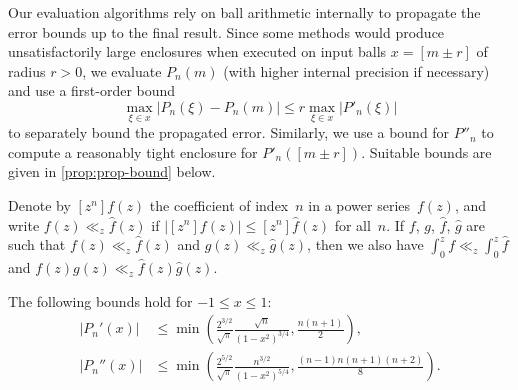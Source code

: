 \documentclass[nohypdvips,review]{siamart0216}
\begin{document}
Our evaluation algorithms rely on ball arithmetic internally to
propagate the error bounds up to the final result.
Since some methods would produce unsatisfactorily large enclosures
when executed on input balls $x = [m \pm r]$ of radius $r > 0$, we
evaluate $P_n(m)$ (with higher internal precision if necessary) and
use a first-order bound
\[ \max_{\xi \in x} |P_n(\xi) - P_n(m)|
   \le r \max_{\xi \in x} |P'_n(\xi)| \]
to separately bound the propagated error.
Similarly, we use a bound for $P''_n$ to compute a reasonably
tight enclosure for $P'_n([m \pm r])$.
Suitable bounds are given in \cref{prop:prop-bound} below.

\begin{lemma} \label{lemma:majorants}
Denote by $[z^n] f(z)$ the coefficient of index $n$ in a power
series $f(z)$, and write $f(z) \ll_z \hat f(z)$ if
$| [z^n] f(z) | \leq [z^n] \hat f(z)$ for all $n$.
If $f$, $g$, $\hat f$, $\hat g$ are such that
$f(z) \ll_z \hat f(z)$ and $g(z) \ll_z \hat g(z)$, then we also have
$\int_0^z f \ll_z \int_0^z \hat f$ and
$f(z)g(z) \ll_z \hat f(z) \hat g(z)$.
\end{lemma}

\begin{proposition} \label{prop:prop-bound}
The following bounds hold for $-1 \leq x \leq 1$:
\begin{align}
\label{eq:prop-bound}
  |P_n'(x)| &\le \min\left(
      \frac{2^{3/2}}{\sqrt{\pi}} \frac{\sqrt n}{(1-x^2)^{3/4}},
      \frac{n(n+1)}{2}
  \right), \\
\label{eq:prop-bound1}
  |P_n''(x)|
  &\le \min\left(
      \frac{2^{5/2}}{\sqrt{\pi}} \frac{n^{3/2}}{(1-x^2)^{5/4}},
      \frac{(n-1) n (n+1) (n+2)}{8}
  \right).
\end{align}
\end{proposition}
\end{document}
